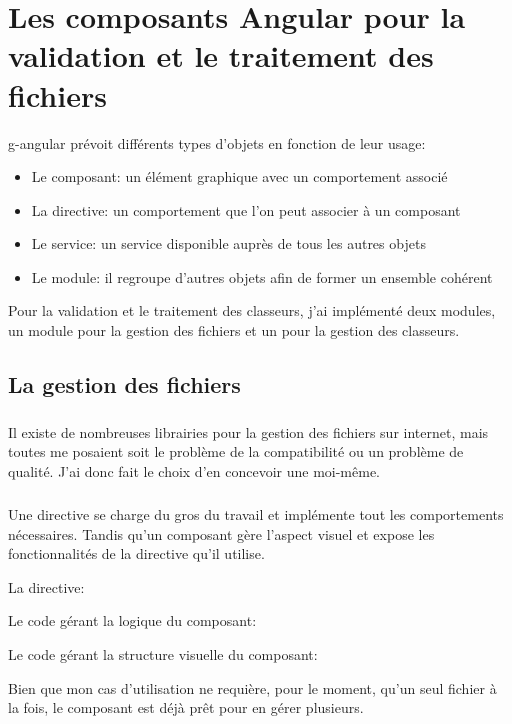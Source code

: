 \chapter{Les composants Angular pour la validation et le traitement des fichiers}
\label{ch:angular-components}

\Gls{g-angular} prévoit différents types d'objets en fonction de leur usage:
\begin{itemize}
    \item Le composant: un élément graphique avec un comportement associé
    \item La directive: un comportement que l'on peut associer à un composant
    \item Le service: un service disponible auprès de tous les autres objets
    \item Le module: il regroupe d'autres objets afin de former un ensemble cohérent
\end{itemize}

Pour la validation et le traitement des classeurs, j'ai implémenté deux modules, un module pour la gestion des fichiers et un pour la gestion des classeurs.

\section{La gestion des fichiers}
\label{sec:file-management}

\paragraph{}
Il existe de nombreuses librairies pour la gestion des fichiers sur internet, mais toutes me posaient soit le problème de la compatibilité ou un problème de qualité.
J'ai donc fait le choix d'en concevoir une moi-même.

\paragraph{}
Une directive se charge du gros du travail et implémente tout les comportements nécessaires.
Tandis qu'un composant gère l'aspect visuel et expose les fonctionnalités de la directive qu'il utilise.

La directive:


Le code gérant la logique du composant:


Le code gérant la structure visuelle du composant:

Bien que mon cas d'utilisation ne requière, pour le moment, qu'un seul fichier à la fois, le composant est déjà prêt pour en gérer plusieurs.
